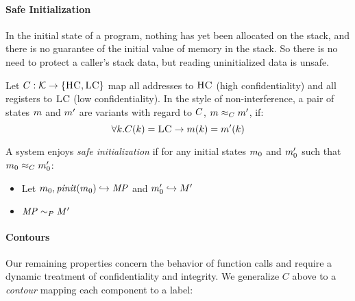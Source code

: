 \documentclass[conference]{IEEEtran}
\begin{document}

    \paragraph{Safe Initialization}

    
      In the initial state of a program, nothing has yet been allocated on the stack, and
      there is no guarantee of the initial value of memory in the stack. So there is no
      need to protect a caller's stack data, but reading uninitialized data is unsafe.

      Let \(C : {\mathcal K} \rightarrow \{\textsc{HC},\textsc{LC}\}\) map all addresses
      to \(\textsc{HC}\) (high confidentiality) and all registers to \(\textsc{LC}\)
      (low confidentiality). In the style of non-interference, a pair of states \(m\)
      and \(m'\) are variants with regard to \(C\), \(m \approx_C m'\), if:
      \[\forall k . C(k) = \textsc{LC} \rightarrow m(k) = m'(k)\]
      
      A system enjoys {\it safe initialization} if for any initial states \(m_0\)
      and \(m_0'\) such that \(m_0 \approx_C m_0'\):

      \begin{itemize}
        \item Let \(m_0,\mathit{pinit}(m_0) \hookrightarrow \mathit{MP}\) and \(m_0' \hookrightarrow M'\)
        \item \(\mathit{MP} \sim_P M'\)
      \end{itemize}

    \paragraph{Contours}

      Our remaining properties concern the behavior of function calls and require a dynamic treatment
      of confidentiality and integrity. We generalize \(C\) above to a {\it contour} mapping each component
      to a label:
\end{document}
